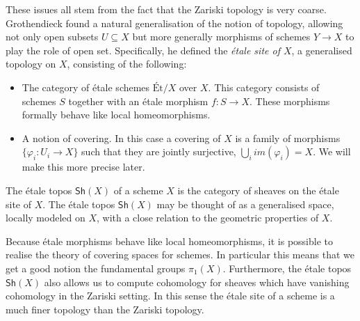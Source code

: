 These issues all stem from the fact that the Zariski topology is very coarse.  Grothendieck found a natural generalisation of the notion of topology, allowing not only open subsets $U \subseteq X$ but more generally morphisms of schemes $Y \to X$ to play the role of open set. Specifically, he defined the \textit{\'etale site of $X$}, a generalised topology on $X$, consisting of the following:


\begin{itemize}
  \item The category of \'etale schemes $\text{\'Et}/X$ over $X$. This category consists of schemes $S$ together with an \'etale morphism $f: S \to X$. These morphisms formally behave like local homeomorphisms. 
  \item A notion of covering. In this case a covering of $X$ is a family of morphisms $\{\varphi_i: U_i \to X\}$ such that they are jointly surjective, $\bigcup_i im(\varphi_i) = X$. We will make this more precise later.
\end{itemize}

The \'etale topos $\mathsf{Sh}(X)$ of a scheme $X$ is the category of sheaves on the \'etale site of $X$.  The \'etale topos $\mathsf{Sh}(X)$ may be thought of as a generalised space, locally modeled on $X$, with a close relation to the geometric properties of $X$. 

Because \'etale morphisms behave like local homeomorphisms, it is possible to realise the theory of covering spaces for schemes. In particular this means that we get a good notion the fundamental groups $\pi_1(X)$. Furthermore, the \'etale topos $\mathsf{Sh}(X)$ also allows us to compute cohomology for sheaves which have vanishing cohomology in the Zariski setting. In this sense the \'etale site of a scheme is a much finer topology than the Zariski topology. 

